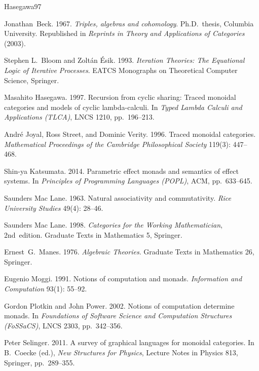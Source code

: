 \documentclass[11pt]{article}
\begin{document}
\begin{thebibliography}{Hasegawa97}

  Jonathan~Beck. 1967.
  \newblock \emph{Triples, algebras and cohomology}.
  \newblock Ph.D.\ thesis, Columbia University.  Republished in
  \emph{Reprints in Theory and Applications of Categories} (2003).

  Stephen L.\ Bloom and Zolt\'an \'Esik. 1993.
  \newblock \emph{Iteration Theories: The Equational Logic of
                  Iterative Processes}.
  \newblock EATCS Monographs on Theoretical Computer Science,
                  Springer.

  Masahito Hasegawa. 1997.
  \newblock Recursion from cyclic sharing: Traced monoidal
            categories and models of cyclic lambda-calculi.
  \newblock In \emph{Typed Lambda Calculi and Applications (TLCA)},
            LNCS 1210, pp.~196--213.

  Andr\'e Joyal, Ross Street, and Dominic Verity. 1996.
  \newblock Traced monoidal categories.
  \newblock \emph{Mathematical Proceedings of the Cambridge
                  Philosophical Society} 119(3): 447--468.

  Shin-ya Katsumata. 2014.
  \newblock Parametric effect monads and semantics of effect
            systems.
  \newblock In \emph{Principles of Programming Languages (POPL)},
            ACM, pp.~633--645.

  Saunders Mac Lane. 1963.
  \newblock Natural associativity and commutativity.
  \newblock \emph{Rice University Studies} 49(4): 28--46.

  Saunders Mac Lane. 1998.
  \newblock \emph{Categories for the Working Mathematician},
            2nd~edition.
  \newblock Graduate Texts in Mathematics 5, Springer.

  Ernest~G.\ Manes. 1976.
  \newblock \emph{Algebraic Theories}.
  \newblock Graduate Texts in Mathematics 26, Springer.

  Eugenio Moggi. 1991.
  \newblock Notions of computation and monads.
  \newblock \emph{Information and Computation} 93(1): 55--92.

  Gordon Plotkin and John Power. 2002.
  \newblock Notions of computation determine monads.
  \newblock In \emph{Foundations of Software Science and Computation
                     Structures (FoSSaCS)}, LNCS 2303, pp.~342--356.

  Peter Selinger. 2011.
  \newblock A survey of graphical languages for monoidal
            categories.
  \newblock In B.~Coecke (ed.), \emph{New Structures for Physics},
            Lecture Notes in Physics 813, Springer,
            pp.~289--355.

\end{thebibliography}
\end{document}
